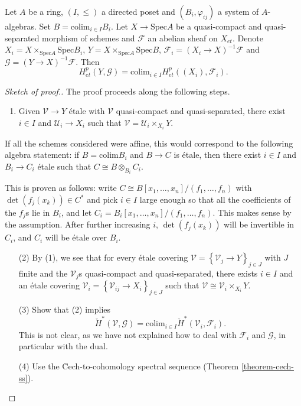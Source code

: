 \begin{theorem}
\label{theorem-directed-colimit-cohomology}
Let $A$ be a ring, $(I, \leq)$ a directed poset and $(B_i, \varphi_{ij})$ a
system of $A$-algebras. Set $B=\text{colim}_{i\in I} B_i$. Let $X \to
\text{Spec} A$ be a quasi-compact and quasi-separated morphism of schemes and
$\mathcal{F}$ an abelian sheaf on $X_{et}$. Denote $X_i = X\times_{\text{Spec}
A} \text{Spec} B_i$, $Y= X \times_{\text{Spec} A}\text{Spec} B$,
$\mathcal{F}_i = (X_i\to X)^{-1}\mathcal{F}$ and $\mathcal{G} = (Y\to
X)^{-1}\mathcal{F}$. Then
$$
H_{et}^p(Y, \mathcal{G}) = \text{colim}_{i\in I} H_{et}^p ((X_i),
\mathcal{F}_i).
$$
\end{theorem}

\begin{proof}[Sketch of proof.]
The proof proceeds along the following steps.
\begin{enumerate}
\item Given $\mathcal{V}\to Y$ \'etale with $\mathcal{V}$ quasi-compact and
quasi-separated, there exist $i\in I$ and $\mathcal{U}_i \to X_i$ such that
$\mathcal{V} = \mathcal{U}_i \times_{X_i} Y$.
\end{enumerate}
If all the schemes considered were affine, this would correspond to the
following algebra statement: if $B=\text{colim} B_i$ and $B\to C$ is \'etale,
then there exist $i\in I$ and $B_i\to C_i$ \'etale such that $C \cong B
\otimes_{B_i} C_i$.

\medskip\noindent
This is proven as follows: write $C \cong B\left[x_1,\ldots, x_n\right]/(f_1,
\ldots, f_n)$ with $\det (f_j(x_k)) \in C^*$ and pick $i\in I$ large enough so
that all the coefficients of the $f_j$s lie in $B_i$, and let $C_i =
B_i\left[x_1, \ldots, x_n\right]/(f_1, \dots, f_n)$. This makes sense by the
assumption. After further increasing $i$, $\det (f_j(x_k))$ will be invertible
in $C_i$, and $C_i$ will be \'etale over $B_i$.
\begin{enumerate}
\item[(2)]
By (1), we see that for every \'etale covering $\mathcal{V} =
\left\{\mathcal{V}_j\to Y\right\}_{j\in J}$ with $J$ finite and the
$\mathcal{V}_j$s quasi-compact and quasi-separated, there exists $i\in I$ and
an \'etale covering $\mathcal{V}_i = \left\{\mathcal{V}_{ij} \to X_i
\right\}_{j\in J}$ such that $\mathcal{V} \cong \mathcal{V}_i\times_{X_i} Y$.
\item[(3)]
Show that (2) implies
$$
\check H^*(\mathcal{V}, \mathcal{G})=\text{colim}_{i\in I}\check
H^*(\mathcal{V}_i, \mathcal{F}_i).
$$
This is not clear, as we have not explained how to deal with $\mathcal{F}_i$
and $\mathcal{G}$, in particular with the dual.
\item[(4)] Use the \u Cech-to-cohomology spectral sequence
(Theorem \ref{theorem-cech-ss}).
\end{enumerate}
\end{proof}





